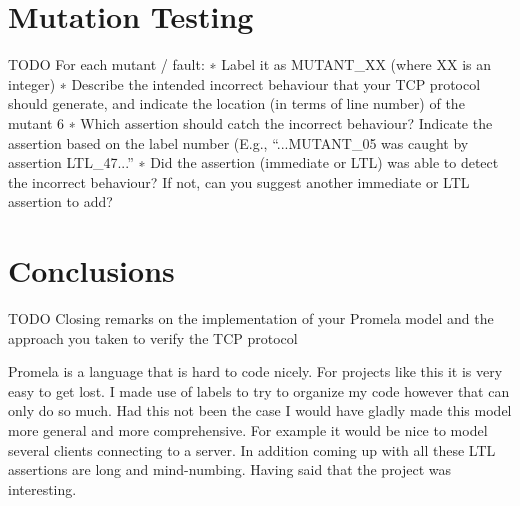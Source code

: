 \documentclass{WigReport}
\begin{document}
\section{Mutation Testing}

TODO
For each mutant / fault:
∗ Label it as MUTANT\_XX (where XX is an integer)
∗ Describe the intended incorrect behaviour that your TCP protocol should generate, and indicate the location (in terms of line number) of the mutant 6
∗ Which assertion should catch the incorrect behaviour? Indicate the assertion based on the label number (E.g., “...MUTANT\_05 was caught by assertion LTL\_47...”
∗ Did the assertion (immediate or LTL) was able to detect the incorrect behaviour? If not, can you suggest another immediate or LTL assertion to add?

\section{Conclusions}

TODO Closing remarks on the implementation of your Promela model and the approach you taken to verify the TCP protocol

Promela is a language that is hard to code nicely. For projects like this it is very easy to get lost. I made use of labels to try to organize my code however that can only do so much. Had this not been the case I would have gladly made this model more general and more comprehensive. For example it would be nice to model several clients connecting to a server. In addition coming up with all these LTL assertions are long and mind-numbing. Having said that the project was interesting.
\end{document}
